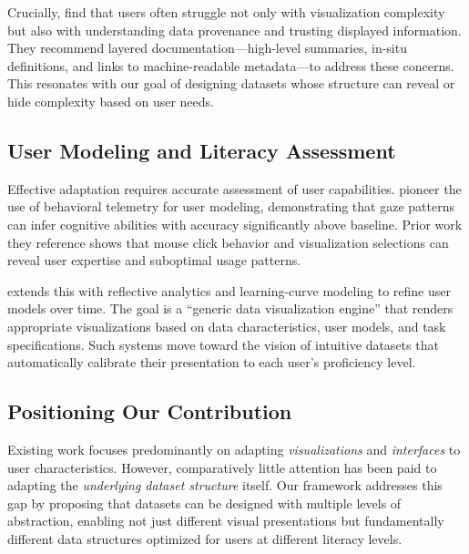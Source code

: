 \documentclass[Afour,times,sageh]{sagej}
\begin{document}
\noindent Crucially, \citeauthor{alhamadi2022dataqualitymismatched} find that users often struggle not only with visualization complexity but also with understanding data provenance and trusting displayed information. They recommend layered documentation---high-level summaries, in-situ definitions, and links to machine-readable metadata---to address these concerns. This resonates with our goal of designing datasets whose structure can reveal or hide complexity based on user needs.

\subsection{User Modeling and Literacy Assessment}

\noindent Effective adaptation requires accurate assessment of user capabilities. \citet{steichen2013useradaptiveinformationvisualization} pioneer the use of behavioral telemetry for user modeling, demonstrating that gaze patterns can infer cognitive abilities with accuracy significantly above baseline. Prior work they reference shows that mouse click behavior and visualization selections can reveal user expertise and suboptimal usage patterns.

\vspace{1em}

\noindent \citet{amyrotos2021adaptivevisualizationsfor} extends this with reflective analytics and learning-curve modeling to refine user models over time. The goal is a ``generic data visualization engine'' that renders appropriate visualizations based on data characteristics, user models, and task specifications. Such systems move toward the vision of intuitive datasets that automatically calibrate their presentation to each user's proficiency level.

\subsection{Positioning Our Contribution}

\noindent Existing work focuses predominantly on adapting \textit{visualizations} and \textit{interfaces} to user characteristics. However, comparatively little attention has been paid to adapting the \textit{underlying dataset structure} itself. Our framework addresses this gap by proposing that datasets can be designed with multiple levels of abstraction, enabling not just different visual presentations but fundamentally different data structures optimized for users at different literacy levels.
\end{document}
